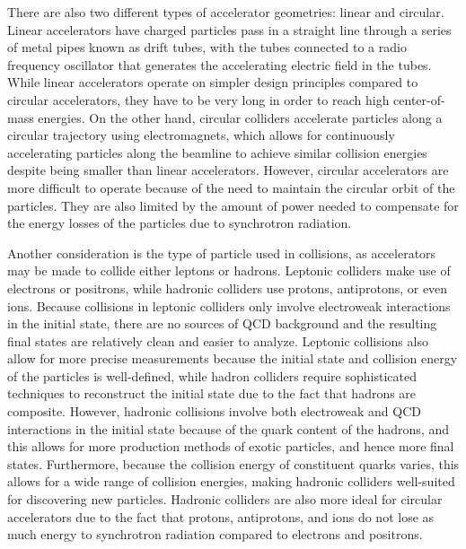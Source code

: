 There are also two different types of accelerator geometries: linear and circular.
Linear accelerators have charged particles pass in a straight line through a series of metal pipes known as drift tubes, with the tubes connected to a radio frequency oscillator that generates the accelerating electric field in the tubes.
While linear accelerators operate on simpler design principles compared to circular accelerators, they have to be very long in order to reach high center-of-mass energies.
On the other hand, circular colliders accelerate particles along a circular trajectory using electromagnets, which allows for continuously accelerating particles along the beamline to achieve similar collision energies despite being smaller than linear accelerators.
However, circular accelerators are more difficult to operate because of the need to maintain the circular orbit of the particles.
They are also limited by the amount of power needed to compensate for the energy losses of the particles due to synchrotron radiation.

Another consideration is the type of particle used in collisions, as accelerators may be made to collide either leptons or hadrons.
Leptonic colliders make use of electrons or positrons, while hadronic colliders use protons, antiprotons, or even ions.
Because collisions in leptonic colliders only involve electroweak interactions in the initial state, there are no sources of QCD background and the resulting final states are relatively clean and easier to analyze.
Leptonic collisions also allow for more precise measurements because the initial state and collision energy of the particles is well-defined, while hadron colliders require sophisticated techniques to reconstruct the initial state due to the fact that hadrons are composite.
However, hadronic collisions involve both electroweak and QCD interactions in the initial state because of the quark content of the hadrons, and this allows for more production methods of exotic particles, and hence more final states.
Furthermore, because the collision energy of constituent quarks varies, this allows for a wide range of collision energies, making hadronic colliders well-suited for discovering new particles.
Hadronic colliders are also more ideal for circular accelerators due to the fact that protons, antiprotons, and ions do not lose as much energy to synchrotron radiation compared to electrons and positrons.

